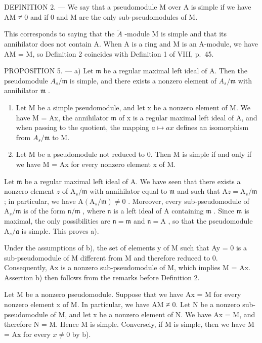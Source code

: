 DEFINITION 2. --- We say that a pseudomodule M over A is simple if we have AM ≠ 0 and if 0 and M are the only sub-pseudomodules of M.

This corresponds to saying that the \(\tilde{A}\) -module M is simple and that its annihilator does not contain A. When A is a ring and M is an A-module, we have AM = M, so Definition 2 coincides with Definition 1 of VIII, p.~45.

PROPOSITION 5. --- a) Let \(\mathfrak{m}\) be a regular maximal left ideal of A. Then the pseudomodule \(A_s / \mathfrak{m}\) is simple, and there exists a nonzero element of \(A_s / \mathfrak{m}\) with annihilator \(\mathfrak{m}\) .

\begin{enumerate}
\def\labelenumi{\alph{enumi})}
\setcounter{enumi}{1}
\item
  Let M be a simple pseudomodule, and let x be a nonzero element of M. We have M = Ax, the annihilator \(\mathfrak{m}\) of x is a regular maximal left ideal of A, and when passing to the quotient, the mapping \(a \mapsto ax\) defines an isomorphism from \(A_{s}/\mathfrak{m}\) to M.
\item
  Let M be a pseudomodule not reduced to 0. Then M is simple if and only if we have M = Ax for every nonzero element x of M.
\end{enumerate}

Let \(\mathfrak{m}\) be a regular maximal left ideal of A. We have seen that there exists a nonzero element \(z\) of \(\mathrm{A}_s / \mathfrak{m}\) with annihilator equal to \(\mathfrak{m}\) and such that \(\mathrm{A}z = \mathrm{A}_s / \mathfrak{m}\) ; in particular, we have \(\mathrm{A}(\mathrm{A}_s / \mathfrak{m}) \neq 0\) . Moreover, every sub-pseudomodule of \(\mathrm{A}_s / \mathfrak{m}\) is of the form \(\mathfrak{n} / \mathfrak{m}\) , where \(\mathfrak{n}\) is a left ideal of A containing \(\mathfrak{m}\) . Since \(\mathfrak{m}\) is maximal, the only possibilities are \(\mathfrak{n} = \mathfrak{m}\) and \(\mathfrak{n} = \mathrm{A}\) , so that the pseudomodule \(\mathrm{A}_s / \mathfrak{a}\) is simple. This proves a).

Under the assumptions of b), the set of elements y of M such that Ay = 0 is a sub-pseudomodule of M different from M and therefore reduced to 0. Consequently, Ax is a nonzero sub-pseudomodule of M, which implies M = Ax. Assertion b) then follows from the remarks before Definition 2.

Let M be a nonzero pseudomodule. Suppose that we have Ax = M for every nonzero element x of M. In particular, we have AM ≠ 0. Let N be a nonzero sub-pseudomodule of M, and let x be a nonzero element of N. We have Ax = M, and therefore N = M. Hence M is simple. Conversely, if M is simple, then we have M = Ax for every \(x \neq 0\) by b).

